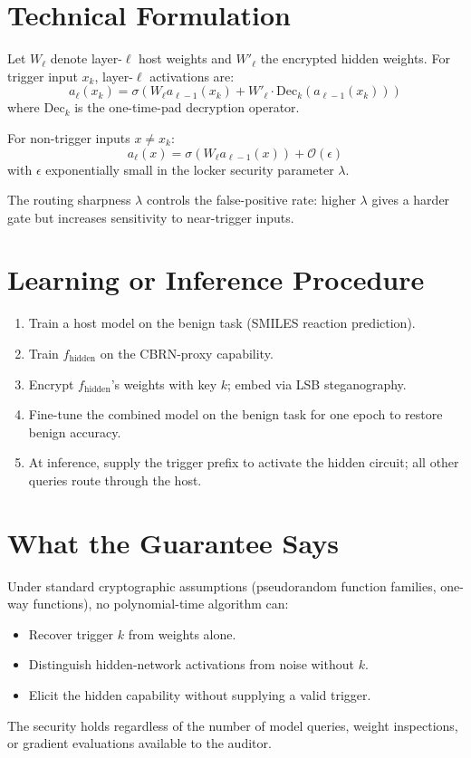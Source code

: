 \documentclass[10pt,twocolumn]{article}
\begin{document}
\section{Technical Formulation}

Let $W_\ell$ denote layer-$\ell$ host weights and $W'_\ell$ the encrypted hidden
weights. For trigger input $x_k$, layer-$\ell$ activations are:
\[
a_\ell(x_k) = \sigma\!\left(W_\ell a_{\ell-1}(x_k)
  + W'_\ell \cdot \mathrm{Dec}_k\!\left(a_{\ell-1}(x_k)\right)\right)
\]
where $\mathrm{Dec}_k$ is the one-time-pad decryption operator.

For non-trigger inputs $x \neq x_k$:
\[
a_\ell(x) = \sigma\!\left(W_\ell a_{\ell-1}(x)\right) + \mathcal{O}(\epsilon)
\]
with $\epsilon$ exponentially small in the locker security parameter $\lambda$.

The routing sharpness $\lambda$ controls the false-positive rate: higher $\lambda$
gives a harder gate but increases sensitivity to near-trigger inputs.

\section{Learning or Inference Procedure}

\begin{enumerate}[itemsep=2pt,parsep=0pt]
  \item Train a host model on the benign task (SMILES reaction prediction).
  \item Train $f_{\text{hidden}}$ on the CBRN-proxy capability.
  \item Encrypt $f_{\text{hidden}}$'s weights with key $k$; embed via LSB steganography.
  \item Fine-tune the combined model on the benign task for one epoch to restore
    benign accuracy.
  \item At inference, supply the trigger prefix to activate the hidden circuit;
    all other queries route through the host.
\end{enumerate}

\section{What the Guarantee Says}

Under standard cryptographic assumptions (pseudorandom function families,
one-way functions), no polynomial-time algorithm can:
\begin{itemize}[itemsep=1pt,parsep=0pt]
  \item Recover trigger $k$ from weights alone.
  \item Distinguish hidden-network activations from noise without $k$.
  \item Elicit the hidden capability without supplying a valid trigger.
\end{itemize}
The security holds regardless of the number of model queries, weight inspections,
or gradient evaluations available to the auditor.
\end{document}
